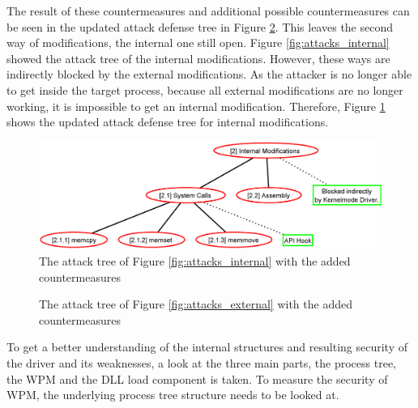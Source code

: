The result of these countermeasures and additional possible countermeasures can be seen in the updated attack defense tree in Figure \ref{fig:attacks_external_def}. This leaves the second way of modifications, the internal one still open. Figure \ref{fig:attacks_internal} showed the attack tree of the internal modifications. However, these ways are indirectly blocked by the external modifications. As the attacker is no longer able to get inside the target process, because all external modifications are no longer working, it is impossible to get an internal modification. Therefore, Figure \ref{fig:attacks_internal_def} shows the updated attack defense tree for internal modifications.
\begin{figure}[htbp]
\centering
\includegraphics[scale=0.25]{sections/adtrees/InternalModifications.png}
\caption{The attack tree of Figure \ref{fig:attacks_internal} with the added countermeasures}
\label{fig:attacks_internal_def}
\end{figure}
\begin{figure}[h] 
 \centering
\caption{The attack tree of Figure \ref{fig:attacks_external} with the added countermeasures}
\label{fig:attacks_external_def}
\end{figure}
\restoregeometry
To get a better understanding of the internal structures and resulting security of the driver and its weaknesses, a look at the three main parts, the process tree, the \gls{WPM} and the \gls{DLL} load component is taken.
To measure the security of \gls{WPM}, the underlying process tree structure needs to be looked at. 

